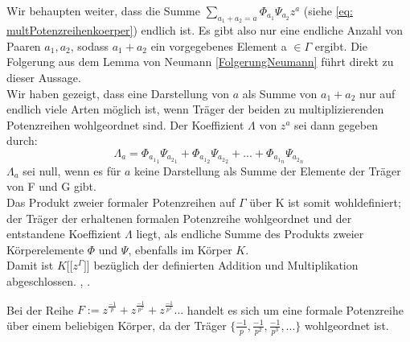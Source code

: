 Wir behaupten weiter, dass die Summe $\sum_{a_1 + a_2 = a}^{}\Phi_{a_1} \Psi_{a_2} z^a$ (siehe \ref{eq: multPotenzreihenkoerper}) endlich ist. Es gibt also nur eine endliche Anzahl von Paaren $a_1, a_2$, sodass $a_1 + a_2$ ein vorgegebenes Element a $\in \Gamma$ ergibt. Die Folgerung aus dem Lemma von Neumann \ref{FolgerungNeumann} führt direkt zu dieser Aussage.  \\
Wir haben gezeigt, dass eine Darstellung von $a$ als Summe von $a_1+ a_2$ nur auf endlich viele Arten möglich ist, wenn Träger der beiden zu multiplizierenden Potenzreihen wohlgeordnet sind. Der Koeffizient $\Lambda$ von $z^a$ sei dann gegeben durch:\\
\[\Lambda_a = \Phi_{{a_1}_1}\Psi_{{a_2}_1} + \Phi_{{a_1}_2}\Psi_{{a_2}_2} + ... + \Phi_{{a_1}_n}\Psi_{{a_2}_n}\]
$\Lambda_a$ sei null, wenn es für $a$ keine Darstellung als Summe der Elemente der Träger von F und G gibt.\\
Das Produkt zweier formaler Potenzreihen auf $\Gamma$ über K ist somit wohldefiniert; der Träger der erhaltenen formalen Potenzreihe wohlgeordnet und der entstandene Koeffizient $\Lambda$ liegt, als endliche Summe des Produkts zweier Körperelemente $\Phi$ und $\Psi$, ebenfalls im Körper $K$. \\
Damit ist $K\lbrack\lbrack z^{\Gamma}\rbrack\rbrack$ bezüglich der definierten Addition und Multiplikation abgeschlossen. \cite[Seite 601ff]{hahn07}, \cite[S. 210- 213]{neumann49}.
%
\begin{bsp}
Bei der Reihe $F := z^{\frac{-1}{p}}+  z^{\frac{-1}{p^2}} + z^{\frac{-1}{p^3}} ...$ handelt es sich um eine formale Potenzreihe über einem beliebigen Körper, da der Träger $\lbrace \frac{-1}{p}, \frac{-1}{p^2}, \frac{-1}{p^3}, ... \rbrace$ wohlgeordnet ist.
\end{bsp}
%
